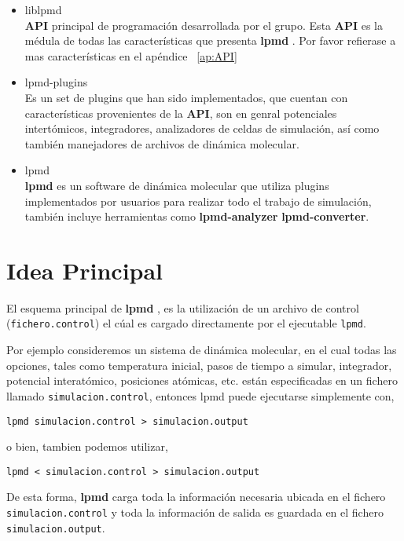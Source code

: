 \documentclass[a4paper,10pt]{scrbook}
\newcommand{\lpmd}{\textbf{lpmd }}
\begin{document}
\begin{itemize}
 \item liblpmd \\
\textbf{API} principal de programaci\'on desarrollada por el grupo. Esta \textbf{API} es la m\'edula de todas las caracter\'isticas que presenta \lpmd. Por favor refierase a mas caracter\'isticas en el ap\'endice ~\ref{ap:API}
 \item lpmd-plugins \\
Es un set de plugins que han sido implementados, que cuentan con caracter\'isticas provenientes de la \textbf{API}, son en genral potenciales intert\'omicos, integradores, analizadores de celdas de simulaci\'on, as\'i como tambi\'en manejadores de archivos de din\'amica molecular.
 \item lpmd \\
\lpmd es un software de din\'amica molecular que utiliza plugins implementados por usuarios para realizar todo el trabajo de simulaci\'on, tambi\'en incluye herramientas como \textbf{lpmd-analyzer} \textbf{lpmd-converter}.
\end{itemize}

\section{Idea Principal}

El esquema principal de \lpmd, es la utilizaci\'on de un archivo de control (\verb|fichero.control|) el c\'ual es cargado directamente por el ejecutable \verb|lpmd|.

Por ejemplo consideremos un sistema de din\'amica molecular, en el cual todas las opciones, tales como temperatura inicial, pasos de tiempo a simular, integrador, potencial interat\'omico, posiciones at\'omicas, etc. est\'an especificadas en un fichero llamado \verb|simulacion.control|, entonces lpmd puede ejecutarse simplemente con,

\begin{center}
 \texttt{lpmd simulacion.control > simulacion.output}
\end{center}

o bien, tambien podemos utilizar,

\begin{center}
 \texttt{lpmd < simulacion.control > simulacion.output}
\end{center}

De esta forma, \lpmd carga toda la informaci\'on necesaria ubicada en el fichero \verb|simulacion.control| y toda la informaci\'on de salida es guardada en el fichero \verb|simulacion.output|.
\end{document}
